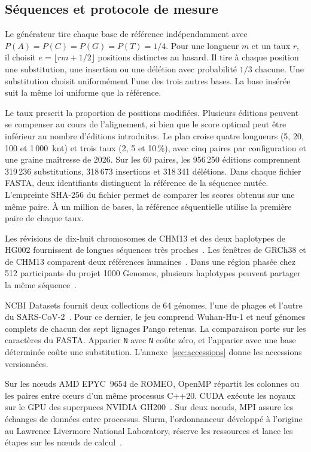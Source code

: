 \subsection{Séquences et protocole de mesure}\label{sec:protocol}
Le générateur tire chaque base de référence indépendamment avec \(P(A)=P(C)=P(G)=P(T)=1/4\). Pour une longueur \(m\) et un taux \(r\), il choisit \(e=\lfloor rm+1/2\rfloor\) positions distinctes au hasard. Il tire à chaque position une substitution, une insertion ou une délétion avec probabilité \(1/3\) chacune. Une substitution choisit uniformément l'une des trois autres bases. La base insérée suit la même loi uniforme que la référence.

Le taux prescrit la proportion de positions modifiées. Plusieurs éditions peuvent se compenser au cours de l’alignement, si bien que le score optimal peut être inférieur au nombre d’éditions introduites. Le plan croise quatre longueurs (5, 20, 100 et 1\,000~knt) et trois taux (2, 5 et 10\,\%), avec cinq paires par configuration et une graine maîtresse de 2026. Sur les 60 paires, les 956\,250 éditions comprennent 319\,236 substitutions, 318\,673 insertions et 318\,341 délétions. Dans chaque fichier FASTA, deux identifiants distinguent la référence de la séquence mutée. L’empreinte SHA-256 du fichier permet de comparer les scores obtenus sur une même paire. À un million de bases, la référence séquentielle utilise la première paire de chaque taux.

Les révisions de dix-huit chromosomes de CHM13 et des deux haplotypes de HG002 fournissent de longues séquences très proches~\cite{chmreleases,hg002data}. Les fenêtres de GRCh38 et de CHM13 comparent deux références humaines~\cite{grch38,t2t}. Dans une région phasée chez 512 participants du projet 1000 Genomes, plusieurs haplotypes peuvent partager la même séquence~\cite{thousandgenomes}.

NCBI Datasets fournit deux collections de 64 génomes, l’une de phages et l’autre du SARS-CoV-2~\cite{ncbidatasets}. Pour ce dernier, le jeu comprend Wuhan-Hu-1 et neuf génomes complets de chacun des sept lignages Pango retenus. La comparaison porte sur les caractères du FASTA. Apparier \texttt{N} avec \texttt{N} coûte zéro, et l’apparier avec une base déterminée coûte une substitution. L’annexe~\ref{sec:accessions} donne les accessions versionnées.

Sur les nœuds AMD EPYC~9654 de ROMEO, OpenMP répartit les colonnes ou les paires entre cœurs d’un même processus C++20. CUDA exécute les noyaux sur le GPU des superpuces NVIDIA GH200~\cite{romeohardware}. Sur deux nœuds, MPI assure les échanges de données entre processus. Slurm, l'ordonnanceur développé à l'origine au Lawrence Livermore National Laboratory, réserve les ressources et lance les étapes sur les nœuds de calcul~\cite{slurm}.

